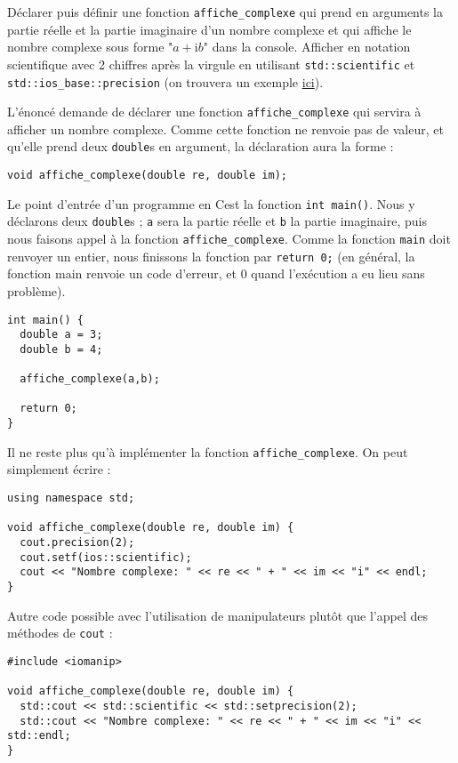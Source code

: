 \documentclass{book}
\newcommand{\inline}[1]{\texttt{#1}}
\newcommand{\cpp}{\mbox{C\vspace{.5em}\protect\raisebox{.2ex}{\footnotesize++~}}}
\begin{document}
Déclarer puis définir une fonction \inline{affiche_complexe} qui prend en arguments la partie réelle et la partie imaginaire d'un nombre complexe et qui affiche le nombre complexe sous forme "$a+\mathrm{i}b$" dans la console. Afficher en notation scientifique avec 2 chiffres après la virgule en utilisant \inline{std::scientific} et \inline{std::ios_base::precision} (on trouvera un exemple \href{https://cplusplus.com/reference/ios/ios_base/precision/}{ici}).

\begin{correction}
L'énoncé demande de déclarer une fonction \inline{affiche_complexe} qui servira à afficher un nombre complexe. Comme cette fonction ne renvoie pas de valeur, et qu'elle prend deux \inline{double}s en argument, la déclaration aura la forme :
\begin{verbatim}
void affiche_complexe(double re, double im);
\end{verbatim}

Le point d'entrée d'un programme en \cpp est la fonction \inline{int main()}. Nous y déclarons deux \inline{double}s ; \inline{a} sera la partie réelle et \inline{b} la partie imaginaire, puis nous faisons appel à la fonction \inline{affiche_complexe}. Comme la fonction \inline{main} doit renvoyer un entier, nous finissons la fonction par \inline{return 0;} (en général, la fonction main renvoie un code d'erreur, et 0 quand l'exécution a eu lieu sans problème).

\begin{verbatim}
int main() {
  double a = 3;
  double b = 4;

  affiche_complexe(a,b);

  return 0;
}
\end{verbatim}

Il ne reste plus qu'à implémenter la fonction \inline{affiche_complexe}. On peut simplement écrire :
\begin{verbatim}
using namespace std;

void affiche_complexe(double re, double im) {
  cout.precision(2);
  cout.setf(ios::scientific);
  cout << "Nombre complexe: " << re << " + " << im << "i" << endl;
}
\end{verbatim}

Autre code possible avec l'utilisation de manipulateurs plutôt que l'appel des méthodes de \texttt{cout} :
\begin{verbatim}
#include <iomanip>

void affiche_complexe(double re, double im) {
  std::cout << std::scientific << std::setprecision(2);
  std::cout << "Nombre complexe: " << re << " + " << im << "i" << std::endl;
}
\end{verbatim}

\end{correction}
\end{document}
